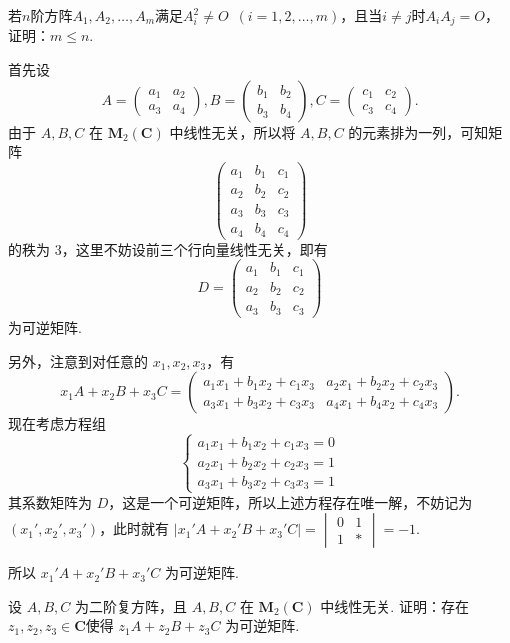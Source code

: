 \begin{exercise}
    \begin{exgroup}
        \item 若$n$阶方阵$A_1,A_2,\ldots,A_m$满足$A_i^2\neq O\enspace(i=1,2,\ldots,m)$，且当$i\neq j$时$A_iA_j=O$，证明：$m\leqslant n$.
        \begin{answer}
            首先设
            \[A=\begin{pmatrix}a_1 & a_2 \\ a_3 & a_4\end{pmatrix},B=\begin{pmatrix}b_1 & b_2 \\ b_3 & b_4\end{pmatrix},C=\begin{pmatrix}c_1 & c_2 \\ c_3 & c_4\end{pmatrix}.\]
            由于 $A,B,C$ 在 $\mathbf{M}_2(\mathbf{C})$ 中线性无关，所以将 $A,B,C$ 的元素排为一列，可知矩阵
            \[\begin{pmatrix}a_1 & b_1 & c_1 \\ a_2 & b_2 & c_2 \\ a_3 & b_3 & c_3 \\ a_4 & b_4 & c_4\end{pmatrix}\]
            的秩为 3，这里不妨设前三个行向量线性无关，即有
            \[D=\begin{pmatrix}a_1 & b_1 & c_1 \\ a_2 & b_2 & c_2 \\ a_3 & b_3 & c_3\end{pmatrix}\]
            为可逆矩阵.

            另外，注意到对任意的 $x_1,x_2,x_3$，有
            \[x_1A+x_2B+x_3C=\begin{pmatrix}a_1x_1+b_1x_2+c_1x_3 & a_2x_1+b_2x_2+c_2x_3 \\ a_3x_1+b_3x_2+c_3x_3 & a_4x_1+b_4x_2+c_4x_3\end{pmatrix}.\]
            现在考虑方程组
            \[\begin{cases}a_1x_1+b_1x_2+c_1x_3 = 0 \\ a_2x_1+b_2x_2+c_2x_3 = 1 \\ a_3x_1+b_3x_2+c_3x_3 = 1\end{cases}\]
            其系数矩阵为 $D$，这是一个可逆矩阵，所以上述方程存在唯一解，不妨记为 $(x_1',x_2',x_3')$，此时就有 $\lvert x_1'A+x_2'B+x_3'C \rvert = \begin{vmatrix}0 & 1 \\ 1 & \ast\end{vmatrix} = -1$.

            所以 $x_1'A+x_2'B+x_3'C$ 为可逆矩阵.
        \end{answer}

        \item 设 $A,B,C$ 为二阶复方阵，且 $A,B,C$ 在 $\mathbf{M}_2(\mathbf{C})$ 中线性无关. 证明：存在$z_1,z_2,z_3 \in \mathbf{C}$使得 $z_1A+z_2B+z_3C$ 为可逆矩阵.
        \begin{answer}

        \end{answer}
    \end{exgroup}

\end{exercise}

